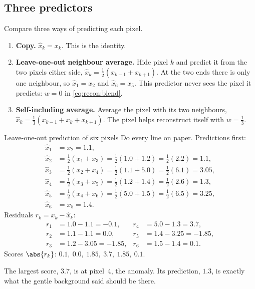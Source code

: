 \subsection{Three predictors}

Compare three ways of predicting each pixel.
\begin{enumerate}
\item \textbf{Copy.} $\hat{x}_k = x_k$. This is the identity.
\item \textbf{Leave-one-out neighbour average.} Hide pixel $k$ and predict it from the two pixels
  either side, $\hat{x}_k = \tfrac{1}{2}(x_{k-1}+x_{k+1})$. At the two ends there is only one
  neighbour, so $\hat{x}_1 = x_2$ and $\hat{x}_6 = x_5$. This predictor never sees the pixel it predicts:
  $w=0$ in \cref{eq:recon:blend}.
\item \textbf{Self-including average.} Average the pixel with its two neighbours,
  $\hat{x}_k = \tfrac{1}{3}(x_{k-1}+x_k+x_{k+1})$. The pixel helps reconstruct itself with
  $w=\tfrac13$.
\end{enumerate}

\begin{worked}[label={we:recon:loo}]{Leave-one-out prediction of six pixels}
Do every line on paper. Predictions first:
\begin{align*}
\hat{x}_1 &= x_2 = 1.1,\\
\hat{x}_2 &= \tfrac12(x_1 + x_3) = \tfrac12(1.0 + 1.2) = \tfrac12(2.2) = 1.1,\\
\hat{x}_3 &= \tfrac12(x_2 + x_4) = \tfrac12(1.1 + 5.0) = \tfrac12(6.1) = 3.05,\\
\hat{x}_4 &= \tfrac12(x_3 + x_5) = \tfrac12(1.2 + 1.4) = \tfrac12(2.6) = 1.3,\\
\hat{x}_5 &= \tfrac12(x_4 + x_6) = \tfrac12(5.0 + 1.5) = \tfrac12(6.5) = 3.25,\\
\hat{x}_6 &= x_5 = 1.4.
\end{align*}
Residuals $r_k = x_k - \hat{x}_k$:
\begin{align*}
r_1 &= 1.0 - 1.1 = -0.1, & r_4 &= 5.0 - 1.3 = 3.7,\\
r_2 &= 1.1 - 1.1 = 0.0,  & r_5 &= 1.4 - 3.25 = -1.85,\\
r_3 &= 1.2 - 3.05 = -1.85, & r_6 &= 1.5 - 1.4 = 0.1.
\end{align*}
Scores $\abs{r_k}$: $0.1,\ 0.0,\ 1.85,\ 3.7,\ 1.85,\ 0.1$.

The largest score, $3.7$, is at pixel~4, the anomaly. Its prediction, $1.3$, is exactly what the gentle
background said should be there.
\end{worked}

